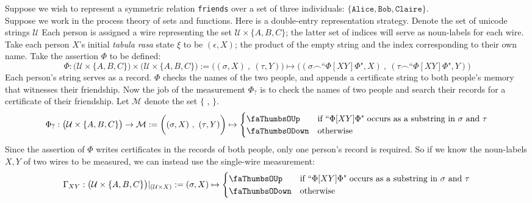 \begin{example}\label{ex:friendsCENT}
Suppose we wish to represent a symmetric relation \texttt{friends} over a set of three individuals: $\{\texttt{Alice},\texttt{Bob},\texttt{Claire}\}$.\\

Suppose we work in the process theory of sets and functions. Here is a double-entry representation strategy. Denote the set of unicode strings $\mathcal{U}$ Each person is assigned a wire representing the set $\mathcal{U} \times \{A,B,C\}$; the latter set of indices will serve as noun-labels for each wire. Take each person $X$'s initial \emph{tabula rasa} state $\xi$ to be $(\epsilon,X)$; the product of the empty string and the index corresponding to their own name. Take the assertion $\Phi$ to be defined:
\[ \Phi : \big( \mathcal{U} \times \{A,B,C\} \big) \times \big( \mathcal{U} \times \{A,B,C\} \big) := \bigg( (\sigma,X) \ , \ (\tau,Y) \bigg) \mapsto \bigg( (\sigma\frown\text{``}\Phi[ X Y ]\Phi\text{"} ,X) \ , \ (\tau\frown\text{``}\Phi[ X Y ]\Phi\text{"},Y) \bigg) \]
Each person's string serves as a record. $\Phi$ checks the names of the two people, and appends a certificate string to both people's memory that witnesses their friendship. Now the job of the measurement $\Phi_?$ is to check the names of two people and search their records for a certificate of their friendship. Let $\mathcal{M}$ denote the set $\{$ \faThumbsOUp, \faThumbsODown $\}$.
\[\Phi_? : \big( \mathcal{U} \times \{A,B,C\} \big) \rightarrow \mathcal{M} := \bigg( (\sigma,X) \ , \ (\tau,Y) \bigg) \mapsto \begin{cases} \text{\faThumbsOUp} & 
\text{if ``}\Phi[X Y]\Phi \text{" occurs as a substring in }\sigma\text{ and }\tau \\
\text{\faThumbsODown} & \text{otherwise}
\end{cases} \]
Since the assertion of $\Phi$ writes certificates in the records of both people, only one person's record is required. So if we know the noun-labels $X,Y$ of two wires to be measured, we can instead use the single-wire measurement:
\[\Gamma_{XY} : \big( \mathcal{U} \times \{A,B,C\} \big)|_{(\mathcal{U} \times X)} := (\sigma,X) \mapsto \begin{cases} \text{\faThumbsOUp} & 
\text{if ``}\Phi[X Y]\Phi \text{" occurs as a substring in }\sigma\text{ and }\tau \\
\text{\faThumbsODown} & \text{otherwise}
\end{cases}\]
\end{example}

